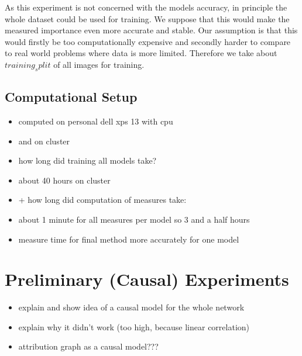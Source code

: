 As this experiment is not concerned with the models accuracy, in principle the whole dataset could be used for training. We suppose that this would make the measured importance even more accurate and stable. Our assumption is that this would firstly be too computationally expensive and secondly harder to compare to real world problems where data is more limited. Therefore we take about $training_split$ of all images for training.

\subsection{Computational Setup}
\label{section:setup}
\begin{itemize}
    \item computed on personal dell xps 13 with cpu
    \item and on cluster 
    \item how long did training all models take?
    \item about 40 hours on cluster
    \item + how long did computation of measures take:
    \item about 1 minute for all measures per model so 3 and a half hours
    \item measure time for final method more accurately for one model 
\end{itemize}

{ \color{gray}
\section{Preliminary (Causal) Experiments}
\begin{itemize}
    \item explain and show idea of a causal model for the whole network
    \item explain why it didn't work (too high, because linear correlation)
    \item attribution graph as a causal model???
\end{itemize}
}